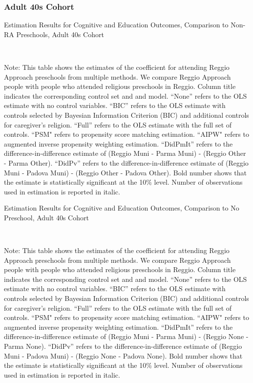 \subsubsection{Adult 40s Cohort}
\begin{table}[H] \caption{Estimation Results for Cognitive and Education Outcomes, Comparison to Non-RA Preschools, Adult 40s Cohort} \label{ols-CN-adult40-reg-other}
\scalebox{0.8}{}
\vspace{1ex} \\
\footnotesize\raggedright{Note: This table shows the estimates of the coefficient for attending Reggio Approach preschools from multiple methods. We compare Reggio Approach people with people who attended religious preschools in Reggio. Column title indicates the corresponding control set and and model. ``None'' refers to the OLS estimate with no control variables. ``BIC'' refers to the OLS estimate with controls selected by Bayesian Information Criterion (BIC) and additional controls for caregiver's religion. ``Full'' refers to the OLS estimate with the full set of controls. ``PSM" refers to propensity score matching estimation. ``AIPW" refers to augmented inverse propensity weighting estimation. ``DidPmIt'' refers to the difference-in-difference estimate of (Reggio Muni - Parma Muni) - (Reggio Other - Parma Other). ``DidPv'' refers to the difference-in-difference estimate of (Reggio Muni - Padova Muni) - (Reggio Other - Padova Other). Bold number shows that the estimate is statistically significant at the 10\% level. Number of observations used in estimation is reported in italic.}
\end{table}

\begin{table}[H] \caption{Estimation Results for Cognitive and Education Outcomes, Comparison to No Preschool, Adult 40s Cohort} \label{ols-CN-adult40-reg-none}
\scalebox{0.8}{}
\vspace{1ex} \\
\footnotesize\raggedright{Note: This table shows the estimates of the coefficient for attending Reggio Approach preschools from multiple methods. We compare Reggio Approach people with people who attended religious preschools in Reggio. Column title indicates the corresponding control set and and model. ``None'' refers to the OLS estimate with no control variables. ``BIC'' refers to the OLS estimate with controls selected by Bayesian Information Criterion (BIC) and additional controls for caregiver's religion. ``Full'' refers to the OLS estimate with the full set of controls. ``PSM" refers to propensity score matching estimation. ``AIPW" refers to augmented inverse propensity weighting estimation. ``DidPmIt'' refers to the difference-in-difference estimate of (Reggio Muni - Parma Muni) - (Reggio None - Parma None). ``DidPv'' refers to the difference-in-difference estimate of (Reggio Muni - Padova Muni) - (Reggio None - Padova None). Bold number shows that the estimate is statistically significant at the 10\% level. Number of observations used in estimation is reported in italic.}
\end{table}


